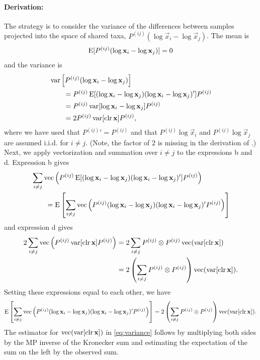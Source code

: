 \paragraph{Derivation:}

The strategy is to consider the variance of the differences between samples
projected into the space of shared taxa, $P^{(ij)} (\log \vec x_i - \log \vec
x_j)$. The mean is 
\begin{align} 
  \label{}
  \operatorname{E} [P^{(ij)} ( \log \mathbf{x}_i - \log \mathbf{x}_j )] = 0
\end{align}
and the variance is
\begin{subequations} 
  \label{eq:xij-var}
\begin{align} 
  &\operatorname{var} \left[P^{(ij)}(\log \mathbf{x}_i - \log \mathbf{x}_j) \right]
  \\&\qquad= P^{(ij)} \operatorname{E}[ (\log \mathbf{x}_i - \log \mathbf{x}_j)(\log \mathbf{x}_i - \log \mathbf{x}_j)'] P^{(ij)} 
  \\&\qquad= P^{(ij)} \operatorname{var}[\log \mathbf{x}_i - \log \mathbf{x}_j] P^{(ij)}
  \\&\qquad= 2 P^{(ij)} \operatorname{var}[\operatorname{clr} \mathbf{x}] P^{(ij)},
\end{align}
\end{subequations}
where we have used that $P^{(ij)}' = P^{(ij)}$ and that $P^{(ij)} \log \vec
x_i$ and $P^{(ij)} \log \vec x_j$ are assumed i.i.d. for $i \ne j$. (Note, the
factor of 2 is missing in the derivation of \textcite{vandenBoogaart2006}.)
Next, we apply vectorization and summation over $i\ne j$ to the expressions b
and d. Expression b gives 
\begin{align*} 
  & \sum_{i\ne j} \operatorname{vec} \left( P^{(ij)} \operatorname{E}[ (\log \mathbf{x}_i - \log \mathbf{x}_j)(\log \mathbf{x}_i - \log \mathbf{x}_j)'] P^{(ij)} \right)
  \\&\qquad = \operatorname{E} \left[ \sum_{i\ne j} \operatorname{vec} \left( P^{(ij)} (\log \mathbf{x}_i -
      \log \mathbf{x}_j)(\log \mathbf{x}_i - \log \mathbf{x}_j)' P^{(ij)} \right) \right]
\end{align*}
and expression d gives
\begin{align*}
  2 \sum_{i\ne j} \operatorname{vec} \left(P^{(ij)} \operatorname{var}[\operatorname{clr} \mathbf{x}] P^{(ij)} \right)
  &= 2 \sum_{i\ne j} P^{(ij)} \otimes P^{(ij)} \operatorname{vec} ( \operatorname{var}[\operatorname{clr} \mathbf{x}] )
  \\&= 2 \left( \sum_{i\ne j} P^{(ij)} \otimes P^{(ij)}\right) 
    \operatorname{vec} ( \operatorname{var}[\operatorname{clr} \mathbf{x}] ).
\end{align*}
Setting these expressions equal to each other, we have
\begin{align} 
  \label{}
  \operatorname{E} \left[ \sum_{i\ne j} \operatorname{vec} \left( P^{(ij)} (\log \mathbf{x}_i - \log \mathbf{x}_j)(\log \mathbf{x}_i - \log \mathbf{x}_j)' P^{(ij)} \right) \right]
  = 2 \left( \sum_{i\ne j} P^{(ij)} \otimes P^{(ij)}\right) 
    \operatorname{vec} ( \operatorname{var}[\operatorname{clr} \mathbf{x}] ).
\end{align}
The estimator for $\operatorname{vec} ( \operatorname{var}[\operatorname{clr} \mathbf{x}])$ in \eqref{eq:variance}
follows by multiplying both sides by the MP inverse of the Kronecker sum and
estimating the expectation of the sum on the left by the observed sum.

